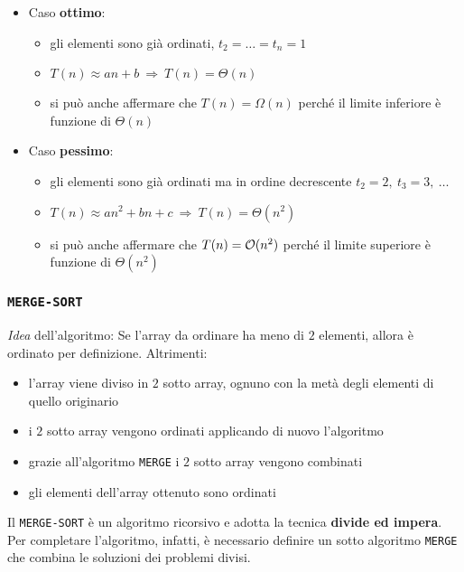 \documentclass[italian, 10pt]{article}
\begin{document}
\begin{itemize}
  \item Caso \textbf{ottimo}:
        \begin{itemize}
          \item gli elementi sono già ordinati, \(t_2 = \ldots = t_n = 1\)
          \item \(T(n) \approx an + b \ \Rightarrow \  T(n) = \Theta(n)\)
          \item si può anche affermare che \(T(n) = \Omega(n)\) perché il limite inferiore è funzione di \(\Theta(n)\)
        \end{itemize}
  \item Caso \textbf{pessimo}:
        \begin{itemize}
          \item gli elementi sono già ordinati ma in ordine decrescente \(t_2 = 2,\ t_3 = 3,\ \ldots\)
          \item \(T(n) \approx an^2 + bn + c \ \Rightarrow \ T(n) = \Theta(n^2)\)
          \item si può anche affermare che \(T(n) = \mathcal{O}(n^2)\) perché il limite superiore è funzione di \(\Theta(n^2)\)
        \end{itemize}
\end{itemize}

\subsubsection{\texttt{MERGE-SORT}}

\textit{Idea} dell'algoritmo:
Se l'array da ordinare ha meno di \(2\) elementi, allora è ordinato per definizione.
Altrimenti:
\begin{itemize}
  \item l'array viene diviso in \(2\) sotto array, ognuno con la metà degli elementi di quello originario
  \item i \(2\) sotto array vengono ordinati applicando di nuovo l'algoritmo
  \item grazie all'algoritmo \texttt{MERGE} i \(2\) sotto array vengono combinati
  \item gli elementi dell'array ottenuto sono ordinati
\end{itemize}

Il \texttt{MERGE-SORT} è un algoritmo ricorsivo e adotta la tecnica \textbf{divide ed impera}.
Per completare l'algoritmo, infatti, è necessario definire un sotto algoritmo \texttt{MERGE} che combina le soluzioni dei problemi divisi.
\end{document}
